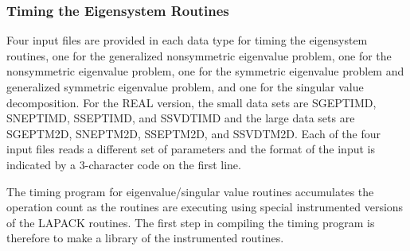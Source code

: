 \subsubsection{Timing the Eigensystem Routines}

\dent
Four input files are provided in each data type for timing the
eigensystem routines,
one for the generalized nonsymmetric eigenvalue problem, 
one for the nonsymmetric eigenvalue problem, 
one for the symmetric eigenvalue problem and generalized symmetric
eigenvalue problem,
and one for the singular value decomposition.
For the REAL version, the small data sets are
SGEPTIMD, SNEPTIMD, SSEPTIMD, and SSVDTIMD and the large
data sets are SGEPTM2D, SNEPTM2D, SSEPTM2D, and SSVDTM2D.
Each of the four input files reads a different set of parameters
and the format of the input is indicated by a 3-character code
on the first line.

The timing program for eigenvalue/singular value routines accumulates
the operation count as the routines are executing using special
instrumented versions of the LAPACK routines.  The first step in
compiling the timing program is therefore to make a library of the
instrumented routines.

